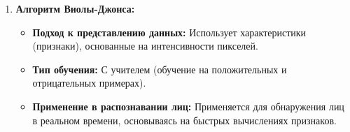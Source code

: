 \begin{enumerate}
    \item\textbf{Алгоритм Виолы-Джонса:}
    \begin{itemize}
        \item \textbf{Подход к представлению данных:} Использует характеристики (признаки), основанные на интенсивности пикселей.
        \item \textbf{Тип обучения:} С учителем (обучение на положительных и отрицательных примерах).
        \item \textbf{Применение в распознавании лиц:} Применяется для обнаружения лиц в реальном времени, основываясь на быстрых вычислениях признаков.
    \end{itemize}
    
\end{enumerate}